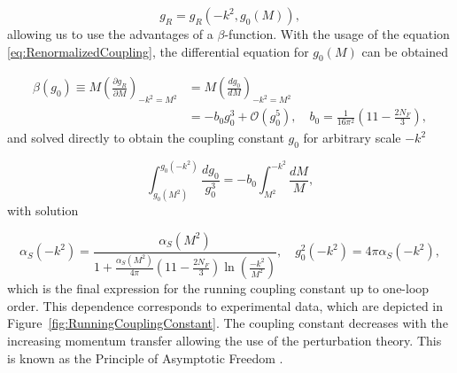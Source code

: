\begin{equation}
  g_R = g_R(-k^2,g_0(M)),
  \label{eq:RunningCouplingConstantDependenceSchema}
\end{equation}
allowing us to use the advantages of a $\beta$-function. With the usage of the
equation \eqref{eq:RenormalizedCoupling}, the differential equation for $g_0(M)$
can be obtained

\begin{align}
  \beta(g_0) \equiv M \left( \frac{\partial g_R}{\partial M} \right)_{-k^2=M^2}
  &= M \left( \frac{dg_0}{dM} \right)_{-k^2=M^2}
  \label{eq:BetaFunction1} \\
  &= -b_0 g_0^3 + \mathscr{O}(g_0^5)
  , \quad b_0 = \frac{1}{16\pi^2}\left(11-\frac{2N_F}{3}\right),
  \label{eq:BetaFunction2}
\end{align}
and solved directly to obtain the coupling constant $g_0$ for arbitrary
scale $-k^2$

\begin{equation}
  \int_{g_0(M^2)}^{g_0(-k^2)} \frac{dg_0}{g_0^3} =
  -b_0 \int_{M^2}^{-k^2}\frac{dM}{M},
  \label{eq:RunningCouplingConstantIntegralEquation}
\end{equation}
with solution

\begin{equation}
  \alpha_S(-k^2) = \frac{\alpha_S(M^2)}{1 + \frac{\alpha_S(M^2)}{4\pi} \left(
  11-\frac{2N_F}{3} \right) \ln \left( \frac{-k^2}{M^2} \right) }
  , \quad g_0^2(-k^2) = 4 \pi \alpha_S( -k^2 ),
  \label{eq:RunningCouplingConstant}
\end{equation}
which is the final expression for the running coupling constant up to one-loop
order. This dependence corresponds to experimental data, which are depicted in
Figure~\ref{fig:RunningCouplingConstant}. The coupling constant decreases with
the increasing momentum transfer allowing the use of the perturbation theory. This
is known as the Principle of Asymptotic Freedom \cite{AssymptoticFreedom}.

